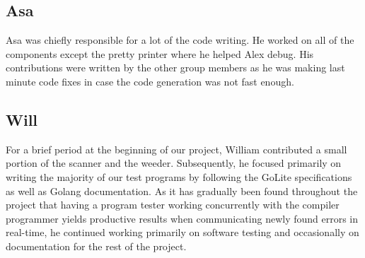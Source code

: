 \documentclass{article}
\begin{document}
\subsection{Asa}

Asa was chiefly responsible for a lot of the code writing. He worked on all of the components except the pretty printer where he helped Alex debug. His contributions were written by the other group members as he was making last minute code fixes in case the code generation was not fast enough.

\subsection{Will}
For a brief period at the beginning of our project, William contributed a small portion of the scanner and the weeder. Subsequently, he focused primarily on writing the majority of our test programs by following the GoLite specifications as well as Golang documentation. As it has gradually been found throughout the project that having a program tester working concurrently with the compiler programmer yields productive results when communicating newly found errors in real-time, he continued working primarily on software testing and occasionally on documentation for the rest of the project. 

\nocite{*}


\end{document}
